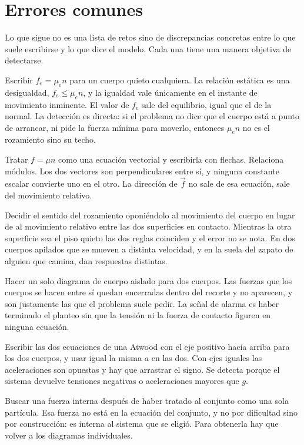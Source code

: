 \documentclass[11pt,openany]{book}
\begin{document}
\section{Errores comunes}

Lo que sigue no es una lista de retos sino de discrepancias concretas entre lo que suele escribirse y lo que dice el modelo. Cada una tiene una manera objetiva de detectarse.

\begin{erroresComunes}
  \item Escribir $f_e = \mu_e n$ para un cuerpo quieto cualquiera. La relación estática es una desigualdad, $f_e \le \mu_e n$, y la igualdad vale únicamente en el instante de movimiento inminente. El valor de $f_e$ sale del equilibrio, igual que el de la normal. La detección es directa: si el problema no dice que el cuerpo está a punto de arrancar, ni pide la fuerza mínima para moverlo, entonces $\mu_e n$ no es el rozamiento sino su techo.
  \item Tratar $f = \mu n$ como una ecuación vectorial y escribirla con flechas. Relaciona módulos. Los dos vectores son perpendiculares entre sí, y ninguna constante escalar convierte uno en el otro. La dirección de $\vec f$ no sale de esa ecuación, sale del movimiento relativo.
  \item Decidir el sentido del rozamiento oponiéndolo al movimiento del cuerpo en lugar de al movimiento relativo entre las dos superficies en contacto. Mientras la otra superficie sea el piso quieto las dos reglas coinciden y el error no se nota. En dos cuerpos apilados que se mueven a distinta velocidad, y en la suela del zapato de alguien que camina, dan respuestas distintas.
  \item Hacer un solo diagrama de cuerpo aislado para dos cuerpos. Las fuerzas que los cuerpos se hacen entre sí quedan encerradas dentro del recorte y no aparecen, y son justamente las que el problema suele pedir. La señal de alarma es haber terminado el planteo sin que la tensión ni la fuerza de contacto figuren en ninguna ecuación.
  \item Escribir las dos ecuaciones de una Atwood con el eje positivo hacia arriba para los dos cuerpos, y usar igual la misma $a$ en las dos. Con ejes iguales las aceleraciones son opuestas y hay que arrastrar el signo. Se detecta porque el sistema devuelve tensiones negativas o aceleraciones mayores que $g$.
  \item Buscar una fuerza interna después de haber tratado al conjunto como una sola partícula. Esa fuerza no está en la ecuación del conjunto, y no por dificultad sino por construcción: es interna al sistema que se eligió. Para obtenerla hay que volver a los diagramas individuales.

\end{erroresComunes}
\end{document}
